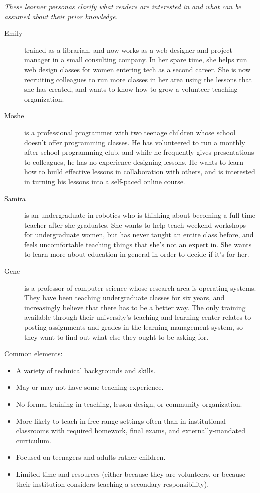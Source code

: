 \emph{These learner personas clarify what readers are interested in and what
can be assumed about their prior knowledge.}

\begin{description}
\item[Emily]
trained as a librarian, and now works as a web designer and project
manager in a small consulting company. In her spare time, she helps
run web design classes for women entering tech as a second career.
She is now recruiting colleagues to run more classes in her area
using the lessons that she has created, and wants to know how to
grow a volunteer teaching organization.
\item[Moshe]
is a professional programmer with two teenage children whose school
doesn't offer programming classes. He has volunteered to run a
monthly after-school programming club, and while he frequently gives
presentations to colleagues, he has no experience designing lessons.
He wants to learn how to build effective lessons in collaboration
with others, and is interested in turning his lessons into a
self-paced online course.
\item[Samira]
is an undergraduate in robotics who is thinking about becoming a
full-time teacher after she graduates. She wants to help teach
weekend workshops for undergraduate women, but has never taught an
entire class before, and feels uncomfortable teaching things that
she's not an expert in. She wants to learn more about education in
general in order to decide if it's for her.
\item[Gene]
is a professor of computer science whose research area is operating
systems. They have been teaching undergraduate classes for six
years, and increasingly believe that there has to be a better way.
The only training available through their university's teaching and
learning center relates to posting assignments and grades in the
learning management system, so they want to find out what else they
ought to be asking for.
\end{description}

Common elements:

\begin{itemize}
\item
  A variety of technical backgrounds and skills.
\item
  May or may not have some teaching experience.
\item
  No formal training in teaching, lesson design, or community
  organization.
\item
  More likely to teach in free-range settings often than in
  institutional classrooms with required homework, final exams, and
  externally-mandated curriculum.
\item
  Focused on teenagers and adults rather children.
\item
  Limited time and resources (either because they are volunteers, or
  because their institution considers teaching a secondary
  responsibility).
\end{itemize}

